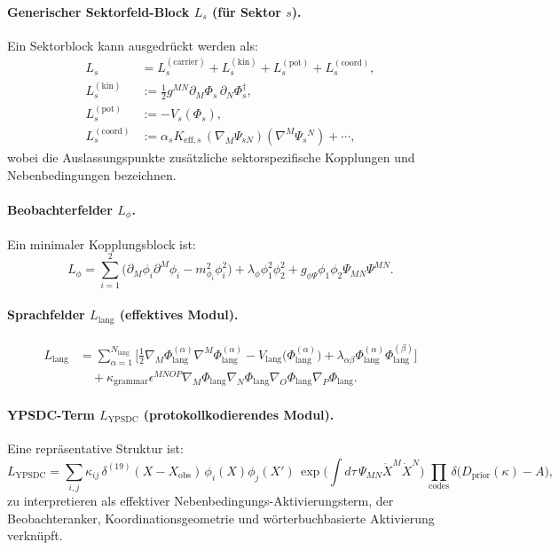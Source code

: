 \documentclass[13pt,a4paper]{article}
\newcommand{\Dprior}{D_{\mathrm{prior}}}
\begin{document}
	\paragraph{Generischer Sektorfeld-Block $L_s$ (für Sektor $s$).}
	Ein Sektorblock kann ausgedrückt werden als:
	\begin{align}
		L_s &= L^{(\mathrm{carrier})}_s + L^{(\mathrm{kin})}_s + L^{(\mathrm{pot})}_s + L^{(\mathrm{coord})}_s, \\
		L^{(\mathrm{kin})}_s &:= \frac{1}{2}g^{MN}\partial_M\Phi_s\,\partial_N\Phi_s^\dagger, \\
		L^{(\mathrm{pot})}_s &:= -V_s(\Phi_s), \\
		L^{(\mathrm{coord})}_s &:= \alpha_s K_{\mathrm{eff},s}\,(\nabla_M\Psi_{sN})(\nabla^M\Psi_{s}{}^{N}) + \cdots,
	\end{align}
	wobei die Auslassungspunkte zusätzliche sektorspezifische Kopplungen und Nebenbedingungen bezeichnen.
	
	\paragraph{Beobachterfelder $L_{\phi}$.}
	Ein minimaler Kopplungsblock ist:
	\begin{equation}
		L_{\phi}=\sum_{i=1}^{2}\Big(\partial_M\phi_i\partial^M\phi_i - m_{\phi_i}^2\phi_i^2\Big) + \lambda_{\phi}\phi_1^2\phi_2^2 + g_{\phi\Psi}\phi_1\phi_2\Psi_{MN}\Psi^{MN}.
	\end{equation}
	
	\paragraph{Sprachfelder $L_{\mathrm{lang}}$ (effektives Modul).}
	\begin{align}
		L_{\mathrm{lang}} &= \sum_{\alpha=1}^{N_{\mathrm{lang}}}\Big[
		\frac{1}{2}\nabla_M\Phi_{\mathrm{lang}}^{(\alpha)}\nabla^M\Phi_{\mathrm{lang}}^{(\alpha)}
		- V_{\mathrm{lang}}\big(\Phi_{\mathrm{lang}}^{(\alpha)}\big)
		+ \lambda_{\alpha\beta}\Phi_{\mathrm{lang}}^{(\alpha)}\Phi_{\mathrm{lang}}^{(\beta)}
		\Big] \nonumber\\
		&\quad + \kappa_{\mathrm{grammar}}\epsilon^{MNOP}\nabla_M\Phi_{\mathrm{lang}}\nabla_N\Phi_{\mathrm{lang}}\nabla_O\Phi_{\mathrm{lang}}\nabla_P\Phi_{\mathrm{lang}}.
	\end{align}
	
	\paragraph{YPSDC-Term $L_{\mathrm{YPSDC}}$ (protokollkodierendes Modul).}
	Eine repräsentative Struktur ist:
	\begin{equation}
		L_{\mathrm{YPSDC}} = \sum_{i,j}\kappa_{ij}\,\delta^{(19)}(X-X_{\mathrm{obs}})\,\phi_i(X)\phi_j(X')\,
		\exp\!\Big(\int d\tau\,\Psi_{MN}\dot X^M\dot X^N\Big)\,
		\prod_{\mathrm{codes}}\delta\big(\Dprior(\kappa)-A\big),
	\end{equation}
	zu interpretieren als effektiver Nebenbedingungs-Aktivierungsterm, der Beobachteranker, Koordinationsgeometrie und wörterbuchbasierte Aktivierung verknüpft.
	
\end{document}
